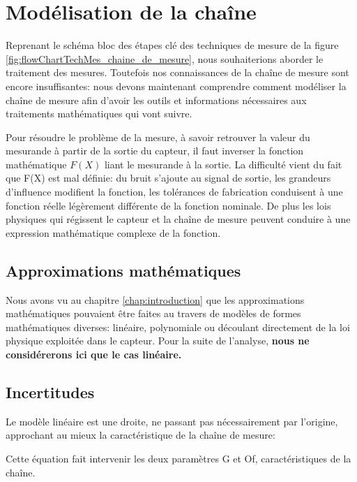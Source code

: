 \chapter{Modélisation de la chaîne}
\label{chap:measurement-chain-modelisation}

Reprenant le schéma bloc des étapes clé des techniques de mesure de la figure \ref{fig:flowChartTechMes_chaine_de_mesure}, nous souhaiterions aborder le traitement des mesures. Toutefois nos connaissances de la chaîne de mesure sont encore insuffisantes: nous devons maintenant comprendre comment modéliser la chaîne de mesure afin d'avoir les outils et informations nécessaires aux traitements mathématiques qui vont suivre.

Pour résoudre le problème de la mesure, à savoir retrouver la valeur du mesurande à partir de la sortie du capteur, il faut inverser la fonction mathématique $F(X)$ liant le mesurande à la sortie. La difficulté vient du fait que F(X) est mal définie: du bruit s'ajoute au signal de sortie, les grandeurs d'influence modifient la fonction, les tolérances de fabrication conduisent à une fonction réelle légèrement différente de la fonction nominale. De plus les lois physiques qui régissent le capteur et la chaîne de mesure peuvent conduire à une expression mathématique complexe de la fonction.

\section{Approximations mathématiques}

Nous avons vu au chapitre \ref{chap:introduction} que les approximations mathématiques pouvaient être faites au travers de modèles de formes mathématiques diverses: linéaire, polynomiale ou découlant directement de la loi physique exploitée dans le capteur. Pour la suite de l'analyse, \textbf{nous ne considérerons ici que le cas linéaire.}

\section{Incertitudes}

Le modèle linéaire est une droite, ne passant pas nécessairement par l'origine, approchant au mieux la caractéristique de la chaîne de mesure:

\begin{center}
\end{center}

Cette équation fait intervenir les deux paramètres G et Of, caractéristiques de la chaîne.

